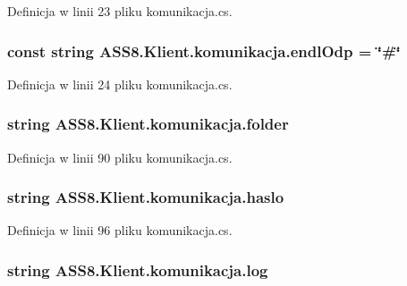 Definicja w linii 23 pliku komunikacja.cs.\hypertarget{a00013_50e87371e5422a5bc0cb7b81a917e569}{
\subsubsection[{endlOdp}]{\setlength{\rightskip}{0pt plus 5cm}const string {\bf ASS8.Klient.komunikacja.endlOdp} = \char`\"{}\#\char`\"{}}}
\label{d7/dd4/a00013_50e87371e5422a5bc0cb7b81a917e569}




Definicja w linii 24 pliku komunikacja.cs.\hypertarget{a00013_1a50c04cee4acf979e3be6b7eeb41843}{
\subsubsection[{folder}]{\setlength{\rightskip}{0pt plus 5cm}string {\bf ASS8.Klient.komunikacja.folder}}}
\label{d7/dd4/a00013_1a50c04cee4acf979e3be6b7eeb41843}




Definicja w linii 90 pliku komunikacja.cs.\hypertarget{a00013_3003b01b9def7b324ad146f5598b00f1}{
\subsubsection[{haslo}]{\setlength{\rightskip}{0pt plus 5cm}string {\bf ASS8.Klient.komunikacja.haslo}}}
\label{d7/dd4/a00013_3003b01b9def7b324ad146f5598b00f1}




Definicja w linii 96 pliku komunikacja.cs.\hypertarget{a00013_4b00947de0ccf2197483dd77d35538f5}{
\subsubsection[{log}]{\setlength{\rightskip}{0pt plus 5cm}string {\bf ASS8.Klient.komunikacja.log}}}
\label{d7/dd4/a00013_4b00947de0ccf2197483dd77d35538f5}




